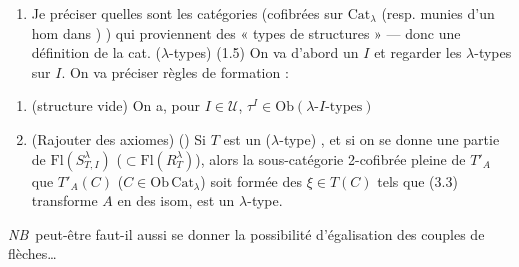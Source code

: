 \documentclass[11pt,a4paper]{article}
\begin{document}
\begin{enumerate}
  \item[{[5]}] Je  préciser quelles sont  les catégories
    (cofibrées sur $\mathrm{Cat}_{\lambda}$ (resp. munies d'un hom dans
    ) ) qui
    proviennent des  « types de structures
     » — donc 
    une définition de la cat. ($\lambda$-types) (1.5)
    On va d'abord \struck{\ill{}}  un $I$ et regarder les
    $\lambda$-types sur $I$. On va préciser  règles de
    formation :
\end{enumerate}

\begin{enumerate}
  \item[a)] (structure vide) On a, pour $I \in \mathcal{U}$,
    \struck{\ill{}} $\tau^{I} \in \mathrm{Ob}(\lambda\text{-}I\text{-types})$
  \item[b)] (Rajouter des axiomes) (\ill{}) Si $T$ est un
    ($\lambda$-type) , et si on se donne une
     partie  de
    $\mathrm{Fl}(S^{\lambda}_{T,I})$ ($\subset \mathrm{Fl}
    (R^{\lambda}_{T})$), alors la sous-catégorie 2-cofibrée
    pleine de $T'_{A}$ 
      que $T'_{A}(C)$ ($C \in
    \mathrm{Ob}\,\mathrm{Cat}_{\lambda}$) soit formée des $\xi \in
    T(C)$ tels que (3.3) transforme $A$ en des isom, est un
    $\lambda$-type.
\end{enumerate}

\emph{NB}\ peut-être faut-il aussi se donner la possibilité
d'égalisation des couples de flèches…\ 
\end{document}
